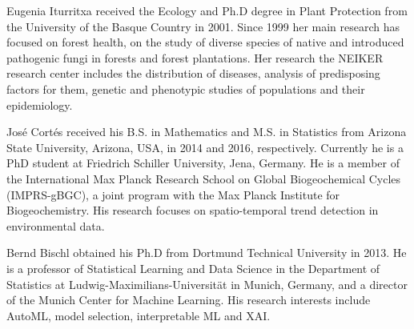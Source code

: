 \documentclass[final]{IEEEtran}
\begin{document}
\begin{IEEEbiography}
	{Eugenia Iturritxa}
	received the Ecology and Ph.D degree in Plant Protection from the University of the Basque Country in 2001.
	Since 1999 her main research has focused on forest health, on the study of diverse species of native and introduced pathogenic fungi in forests and forest plantations.
	Her research the NEIKER research center includes the distribution of diseases, analysis of predisposing factors for them, genetic and phenotypic studies of populations and their epidemiology.
\end{IEEEbiography}
\begin{IEEEbiography}
	{José Cortés}
	received his B.S. in Mathematics and M.S. in Statistics from Arizona State University, Arizona, USA, in 2014 and 2016, respectively.
	Currently he is a PhD student at Friedrich Schiller University, Jena, Germany.
	He is a member of the International Max Planck Research School on Global Biogeochemical Cycles (IMPRS-gBGC), a joint program with the Max Planck Institute for Biogeochemistry.
	His research focuses on spatio-temporal trend detection in environmental data.
\end{IEEEbiography}
\begin{IEEEbiography}
	{Bernd Bischl}
	obtained his Ph.D from Dortmund Technical University in 2013.
	He is a professor of Statistical Learning and Data Science in the Department of Statistics at Ludwig-Maximilians-Universität in Munich, Germany, and a director of the Munich Center for Machine Learning.
	His research interests include AutoML, model selection, interpretable ML and XAI.
\end{IEEEbiography}
\end{document}
